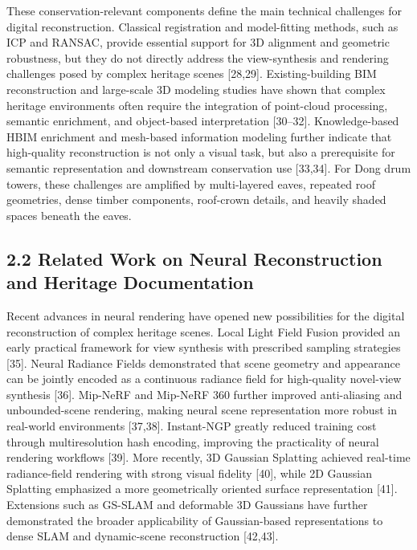 These conservation-relevant components define the main technical
challenges for digital reconstruction. Classical registration and
model-fitting methods, such as ICP and RANSAC, provide essential support
for 3D alignment and geometric robustness, but they do not directly
address the view-synthesis and rendering challenges posed by complex
heritage scenes [28,29]. Existing-building BIM reconstruction and
large-scale 3D modeling studies have shown that complex heritage
environments often require the integration of point-cloud processing,
semantic enrichment, and object-based interpretation [30--32].
Knowledge-based HBIM enrichment and mesh-based information modeling
further indicate that high-quality reconstruction is not only a visual
task, but also a prerequisite for semantic representation and downstream
conservation use [33,34]. For Dong drum towers, these challenges are
amplified by multi-layered eaves, repeated roof geometries, dense timber
components, roof-crown details, and heavily shaded spaces beneath the
eaves.

\subsection{2.2 Related Work on Neural Reconstruction and Heritage
Documentation}\label{related-work-on-neural-reconstruction-and-heritage-documentation}

Recent advances in neural rendering have opened new possibilities for
the digital reconstruction of complex heritage scenes. Local Light Field
Fusion provided an early practical framework for view synthesis with
prescribed sampling strategies [35]. Neural Radiance Fields
demonstrated that scene geometry and appearance can be jointly encoded
as a continuous radiance field for high-quality novel-view synthesis
[36]. Mip-NeRF and Mip-NeRF 360 further improved anti-aliasing and
unbounded-scene rendering, making neural scene representation more
robust in real-world environments [37,38]. Instant-NGP greatly
reduced training cost through multiresolution hash encoding, improving
the practicality of neural rendering workflows [39]. More recently,
3D Gaussian Splatting achieved real-time radiance-field rendering with
strong visual fidelity [40], while 2D Gaussian Splatting emphasized
a more geometrically oriented surface representation [41].
Extensions such as GS-SLAM and deformable 3D Gaussians have further
demonstrated the broader applicability of Gaussian-based representations
to dense SLAM and dynamic-scene reconstruction [42,43].

